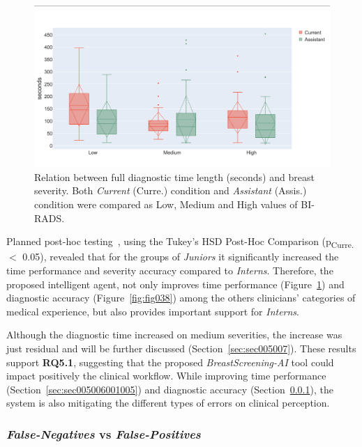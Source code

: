 \begin{figure}[ht]
\centering
\includegraphics[width=\columnwidth]{images/fig037}
\caption{Relation between full diagnostic time length (seconds) and breast severity. Both {\it Current} (Curre.) condition and {\it Assistant} (Assis.) condition were compared as Low, Medium and High values of BI-RADS.}
\label{fig:fig037}
\end{figure}

Planned post-hoc testing~\cite{10.1145/2858036.2858360}, using the Tukey's HSD Post-Hoc Comparison (p\textsubscript{Curre.} $<$ 0.05), revealed that for the groups of {\it Juniors} it significantly increased the time performance and severity accuracy compared to {\it Interns}.
Therefore, the proposed intelligent agent, not only improves time performance (Figure~\ref{fig:fig037}) and diagnostic accuracy (Figure~\ref{fig:fig038}) among the others clinicians' categories of medical experience, but also provides important support for {\it Interns}.

Although the diagnostic time increased on medium severities, the increase was just residual and will be further discussed (Section~\ref{sec:sec005007}).
These results support {\bf RQ5.1}, suggesting that the proposed {\it BreastScreening-AI} tool could impact positively the clinical workflow.
While improving time performance (Section~\ref{sec:sec005006001005}) and diagnostic accuracy (Section~\ref{sec:sec005006001006}), the system is also mitigating the different types of errors on clinical perception.

\subsubsection{{\it False-Negatives} vs {\it False-Positives}}
\label{sec:sec005006001006}

